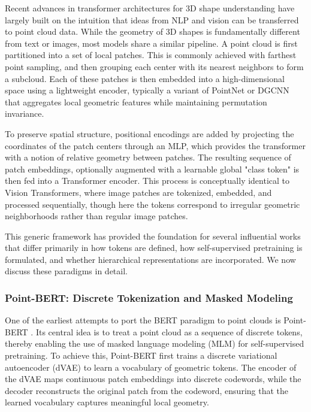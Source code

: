 Recent advances in transformer architectures for 3D shape understanding have largely built on the intuition that ideas from NLP and vision can be transferred to point cloud data. While the geometry of 3D shapes is fundamentally different from text or images, most models share a similar pipeline. A point cloud is first partitioned into a set of local patches. This is commonly achieved with farthest point sampling, and then grouping each center with its nearest neighbors to form a subcloud. Each of these patches is then embedded into a high-dimensional space using a lightweight encoder, typically a variant of PointNet or DGCNN that aggregates local geometric features while maintaining permutation invariance.

To preserve spatial structure, positional encodings are added by projecting the coordinates of the patch centers through an MLP, which provides the transformer with a notion of relative geometry between patches. The resulting sequence of patch embeddings, optionally augmented with a learnable global "class token" is then fed into a Transformer encoder. This process is conceptually identical to Vision Transformers, where image patches are tokenized, embedded, and processed sequentially, though here the tokens correspond to irregular geometric neighborhoods rather than regular image patches.

This generic framework has provided the foundation for several influential works that differ primarily in how tokens are defined, how self-supervised pretraining is formulated, and whether hierarchical representations are incorporated. We now discuss these paradigms in detail.

\subsubsection{Point-BERT: Discrete Tokenization and Masked Modeling}
\label{sssec:pointbert}

One of the earliest attempts to port the BERT paradigm to point clouds is Point-BERT \cite{pbert}. Its central idea is to treat a point cloud as a sequence of discrete tokens, thereby enabling the use of masked language modeling (MLM) for self-supervised pretraining. To achieve this, Point-BERT first trains a discrete variational autoencoder (dVAE) to learn a vocabulary of geometric tokens. The encoder of the dVAE maps continuous patch embeddings into discrete codewords, while the decoder reconstructs the original patch from the codeword, ensuring that the learned vocabulary captures meaningful local geometry.

